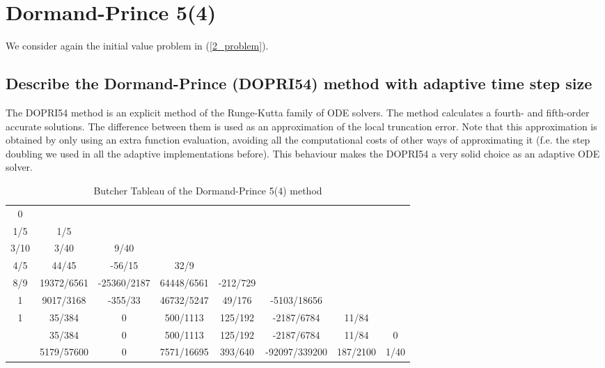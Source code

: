 \section{Dormand-Prince 5(4)}
We consider again the initial value problem in (\ref{2_problem}).

\subsection{Describe the Dormand-Prince (DOPRI54) method with adaptive time step size}
The DOPRI54 method is an explicit method of the Runge-Kutta family of ODE solvers. The method calculates a fourth- and fifth-order accurate solutions. The difference between them is used as an approximation of the local truncation error. Note that this approximation is obtained by only using an extra function evaluation, avoiding all the computational costs of other ways of approximating it (f.e. the step doubling we used in all the adaptive implementations before). This behaviour makes the DOPRI54 a very solid choice as an adaptive ODE solver. 

\begin{table}[H]
\centering
\begin{tabular}{c|ccccccc}
0    &            &             &            &          &               &          &      \\
1/5  & 1/5        &             &            &          &               &          &      \\
3/10 & 3/40       & 9/40        &            &          &               &          &      \\
4/5  & 44/45      & -56/15      & 32/9       &          &               &          &      \\
8/9  & 19372/6561 & -25360/2187 & 64448/6561 & -212/729 &               &          &      \\
1    & 9017/3168  & -355/33     & 46732/5247 & 49/176   & -5103/18656   &          &      \\
1    & 35/384     & 0           & 500/1113   & 125/192  & -2187/6784    & 11/84    &      \\ \hline
     & 35/384     & 0           & 500/1113   & 125/192  & -2187/6784    & 11/84    & 0    \\
     & 5179/57600 & 0           & 7571/16695 & 393/640  & -92097/339200 & 187/2100 & 1/40
\end{tabular}
\caption{Butcher Tableau of the Dormand-Prince 5(4) method}
\label{DOPRI54_Tableau}
\end{table}

